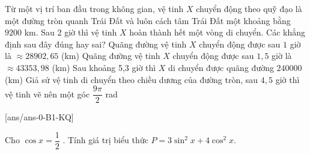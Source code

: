 \begin{ex}%
	Từ một vị trí ban đầu trong không gian, vệ tinh $X$ chuyển động theo quỹ đạo là một đường tròn quanh Trái Đất và luôn cách tâm Trái Đất một khoảng bằng $9200$ km. Sau 2 giờ thì vệ tinh $X$ hoàn thành hết một vòng di chuyển. Các khẳng định  sau đây đúng hay sai? 
	\choiceTF
	{\True Quãng đường vệ tinh $X$ chuyển động được sau $1$ giờ là $\approx 28902{,}65$ (km)}
	{\True Quãng đường vệ tinh $X$ chuyển động được sau $1{,}5$ giờ là $\approx 43353{,}98$ (km)}
	{Sau khoảng 5,3 giờ thì $X$ di chuyển được quãng đường $240000$ (km)}
	{\True Giả sử vệ tinh di chuyển theo chiều dương của đường tròn, sau $4{,}5$ giờ thì vệ tinh vẽ nên một góc $\dfrac{9\pi}{2}$ rad}
\end{ex}




	
	[ans/ans-0-B1-KQ]
	\caukq
	
\begin{ex}%
	Cho $\cos x=\dfrac{1}{2}$ . Tính giá trị biểu thức $P=3\sin ^2 x+4\cos ^2 x$.
\end{ex}





